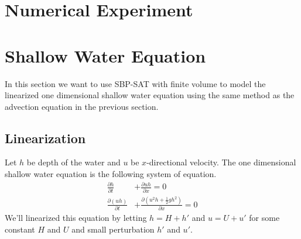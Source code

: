 \documentclass{article}
\newcommand{\half}{\frac{1}{2}}
\theoremstyle{definition}
\begin{document}
\section{Numerical Experiment}
    \newpage
    
\section{Shallow Water Equation}
    In this section we want to use SBP-SAT with finite volume 
    to model the linearized one dimensional shallow water equation 
    using the same method as the advection equation in the previous section.
\subsection{Linearization}
    Let $h$ be depth of the water and $u$ be $x$-directional velocity. 
    The one dimensional shallow water equation is the following system of equation.  
    \begin{align}
        \frac{\partial h}{\partial t} &+ \frac{\partial uh}{\partial x} = 0 \\
        \frac{\partial (uh)}{\partial t} &+ \frac{\partial (u^2 h + \half gh^2) }{\partial x} = 0
    \end{align}
    We'll linearized this equation by letting $h = H + h'$ and $u = U + u'$ 
    for some constant $H$ and $U$ and small perturbation $h'$ and $u'$. 
\end{document}
